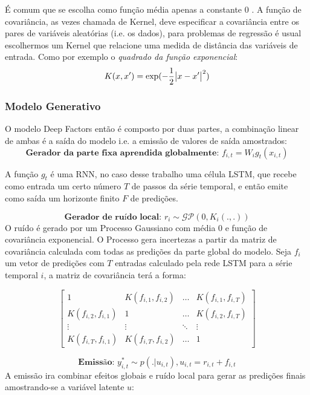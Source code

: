 É comum que se escolha como função média apenas a constante 0 \citep{gpml}.  A função de covariância, as vezes chamada de Kernel, deve especificar a covariância entre os pares de variáveis aleatórias (i.e. os dados), para problemas de regressão é usual escolhermos um Kernel que relacione uma medida de distância das variáveis de entrada. Como por exemplo o \textit{quadrado da função exponencial}: \\

\[
  K(x,x') = \exp(-\frac{1}{2}\abs{x - x'}^2)
\]


\subsubsection{Modelo Generativo}

O modelo Deep Factors então é composto por duas partes, a combinação linear de ambas é a saída do modelo i.e. a emissão de valores de saída amostrados: \\

\[
  \textbf{Gerador da parte fixa aprendida globalmente: }  f_{i,t} = W_ig_t(x_{i,t})
\]

A função $g_t$ é uma RNN, no caso desse trabalho uma célula LSTM, que recebe como entrada um certo número $T$ de passos da série temporal, e então emite como saída um horizonte finito $F$ de predições.


\[
  \textbf{Gerador de ruído local: }  r_i \sim \mathcal{GP} (0, K_i(.,.))
\]
O ruído é gerado por um Processo Gaussiano com média 0 e função de covariância
exponencial. O Processo gera incertezas a partir da matriz de covariância
calculada com todas as predições da parte global do modelo. Seja $f_i$ um vetor
de predições com $T$ entradas calculado pela rede LSTM para a série temporal $i$, a matriz de covariância
terá a forma:  

\[
  \begin{bmatrix}
    1& K(f_{i,1},f_{i,2}) & \dots &K(f_{i,1},f_{i,T}) \\ 
    K(f_{i,2},f_{i,1}) &1  & \dots & K(f_{i,2},f_{i,T})\\ 
    \vdots &  \vdots  & \ddots & \vdots\\
    K(f_{i,T},f_{i,1})& K(f_{i,T},f_{i,2}) & \dots & 1 
  \end{bmatrix} 
\]

\[
  \textbf{Emissão: }  y^*_{i,t} \sim p(. | u_{i,t}) , u_{i,t} = r_{i,t} + f_{i,t}  
\]
A emissão ira combinar efeitos globais e ruído local para gerar as predições
finais amostrando-se a variável latente $u$:
  

